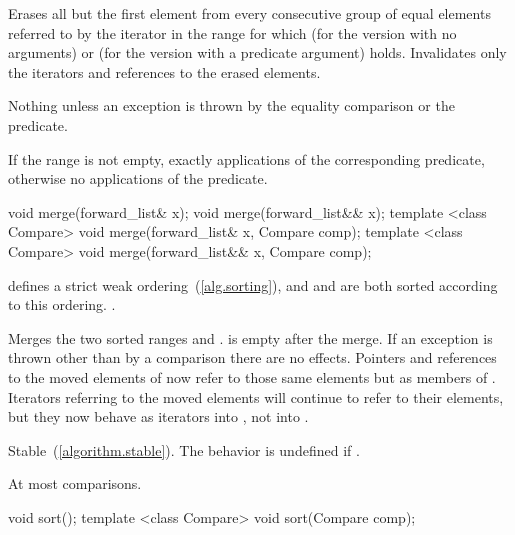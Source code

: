 \begin{itemdescr}
\pnum
\effects Erases all but the first element from every consecutive
group of equal elements referred to by the iterator  in the range  for which  (for the version with no arguments) or  (for the version with a predicate argument) holds.
Invalidates only the iterators and references to the erased elements.

\pnum
\throws Nothing unless an exception is thrown by the equality comparison or the predicate.

\pnum
\complexity If the range  is not empty, exactly  applications of the corresponding predicate, otherwise no applications of the predicate.
\end{itemdescr}

%
\begin{itemdecl}
void merge(forward_list& x);
void merge(forward_list&& x);
template <class Compare> void merge(forward_list& x, Compare comp);
template <class Compare> void merge(forward_list&& x, Compare comp);
\end{itemdecl}

\begin{itemdescr}
\pnum
\requires {} defines a strict weak ordering~(\ref{alg.sorting}), and 
and  are both sorted according to this ordering.
.

\pnum
\effects Merges the two sorted ranges \tcode{[begin(), end())} and
\tcode{[x.begin(), x.end())}.  is empty after the merge. If an
exception is thrown other than by a comparison there are no effects.
Pointers and references to the moved elements of  now refer to those same elements
but as members of . Iterators referring to the moved elements will continue to
refer to their elements, but they now behave as iterators into , not into
.

\pnum
\remarks Stable~(\ref{algorithm.stable}). The behavior is undefined if
.

\pnum
\complexity At most  comparisons.
\end{itemdescr}

%
\begin{itemdecl}
void sort();
template <class Compare> void sort(Compare comp);
\end{itemdecl}


